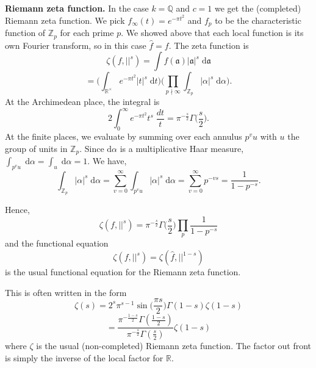 \documentclass[12pt, letterpaper, twoside]
{article}
\newcommand{\Z}{{\mathbb Z}} %
\newcommand{\Q}{{\mathbb Q}} %
\newcommand{\R}{{\mathbb R}} %
\newcommand{\dd}[1]{\mathrm{d}#1} %
\newcommand{\aI}{{\mathfrak{a}}} %
\begin{document}
\textbf{Riemann zeta function.} In the case $k = \Q$ and $c = 1$ we get the
(completed) Riemann zeta function. We pick $f_\infty(t) = e^{-\pi t^2}$ and
$f_p$ to be the characteristic function of $\Z_p$ for each prime $p$. We showed
above that each local function is its own Fourier transform, so in this case
$\hat{f} = f$. The zeta function is
\[\zeta(f, ||^s) = \int f(\aI)|\aI|^s \; \dd \aI\]
\[= \bigg(\int_{\R^\times} e^{-\pi t^2} |t|^s \; \dd t \bigg) \bigg(\prod_{p
\nmid \infty} \int_{\Z_p} |\alpha|^s \; \dd \alpha \bigg).\] At the Archimedean
place, the integral is
\[2 \int_0^\infty e^{-\pi t^2} t^{s} \; \frac{dt}{t} =
\pi^{-\frac{s}{2}}\Gamma\bigg( \frac{s}{2}\bigg).\] At the finite places, we
evaluate by summing over each annulus $p^v u$ with $u$ the group of units in
$\Z_p$. Since $\dd \alpha$ is a multiplicative Haar measure, $\int_{p^v u} \;
\dd \alpha = \int_u \; \dd \alpha = 1$. We have,
\[\int_{\Z_p} |\alpha|^s \; \dd \alpha = \sum_{v = 0}^\infty \int_{p^vu}
|\alpha|^s \; \dd \alpha = \sum_{v = 0}^\infty p^{-vs} = \frac{1}{1 - p^{-s}}.\]

Hence,
\[\zeta(f, ||^s) = \pi^{-\frac{s}{2}}\Gamma \bigg(\frac{s}{2}\bigg) \prod_p
\frac{1}{1 - p^{-s}}\] and the functional equation
\[\zeta(f, ||^s) = \zeta(\hat{f}, ||^{1 - s})\] is the usual functional equation
for the Riemann zeta function. 

This is often written in the form
\[\zeta(s) = 2^{s}\pi^{s -1} \sin \bigg( \frac{\pi s}{2} \bigg) \Gamma(1 - s)
\zeta(1 - s)\]
\[= \frac{\pi^{-\frac{1 - s}{2}}\Gamma(\frac{1 - s}{2})}{\pi^{-\frac{s}{2}}
\Gamma(\frac{s}{2})} \zeta(1 - s)\] where $\zeta$ is the usual (non-completed)
Riemann zeta function. The factor out front is simply the inverse of the local
factor for $\R$.
\end{document}
